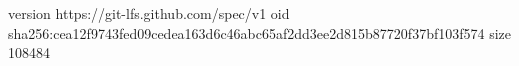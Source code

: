 version https://git-lfs.github.com/spec/v1
oid sha256:cea12f9743fed09cedea163d6c46abc65af2dd3ee2d815b87720f37bf103f574
size 108484
